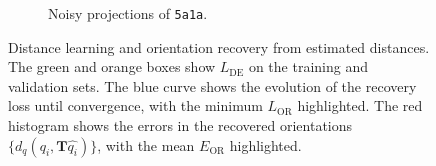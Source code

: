 \begin{figure}[t]
\begin{subfigure}[b]{0.23\linewidth}
        \caption{Noisy projections of \texttt{5a1a}.
        }%
        \label{fig:5a1a-noise16-orientation-recovery}
    \end{subfigure}
    \hfill
    \caption{%
        Distance learning and orientation recovery from estimated distances.
        The green and orange boxes show $L_\text{DE}$  on the training and validation sets.
        The blue curve shows the evolution of the recovery loss until convergence, with the minimum $L_\text{OR}$  highlighted.
        The red histogram shows the errors in the recovered orientations $\{d_q(q_i, \mathbf{T}\widehat{q_i})\}$, with the mean $E_\text{OR}$  highlighted.
    }
\end{figure}

